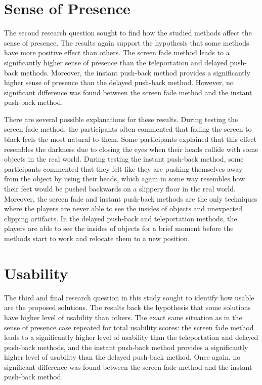 \section{Sense of Presence}

The second research question sought to find how the studied methods affect the sense of presence. The results again support the hypothesis that some methods have more positive effect than others. The screen fade method leads to a significantly higher sense of presence than the teleportation and delayed push-back methods. Moreover, the instant push-back method provides a significantly higher sense of presence than the delayed push-back method. However, no significant difference was found between the screen fade method and the instant push-back method.

There are several possible explanations for these results. During testing the screen fade method, the participants often commented that fading the screen to black feels the most natural to them. Some participants explained that this effect resembles the darkness due to closing the eyes when their heads collide with some objects in the real world. During testing the instant push-back method, some participants commented that they felt like they are pushing themselves away from the object by using their heads, which again in some way resembles how their feet would be pushed backwards on a slippery floor in the real world. Moreover, the screen fade and instant push-back methods are the only techniques where the players are never able to see the insides of objects and unexpected clipping artifacts. In the delayed push-back and teleportation methods, the players are able to see the insides of objects for a brief moment before the methods start to work and relocate them to a new position.

\section{Usability}

The third and final research question in this study sought to identify how usable are the proposed solutions. The results back the hypothesis that some solutions have higher level of usability than others. The exact same situation as in the sense of presence case repeated for total usability scores: the screen fade method leads to a significantly higher level of usability than the teleportation and delayed push-back methods, and the instant push-back method provides a significantly higher level of usability than the delayed push-back method. Once again, no significant difference was found between the screen fade method and the instant push-back method.

